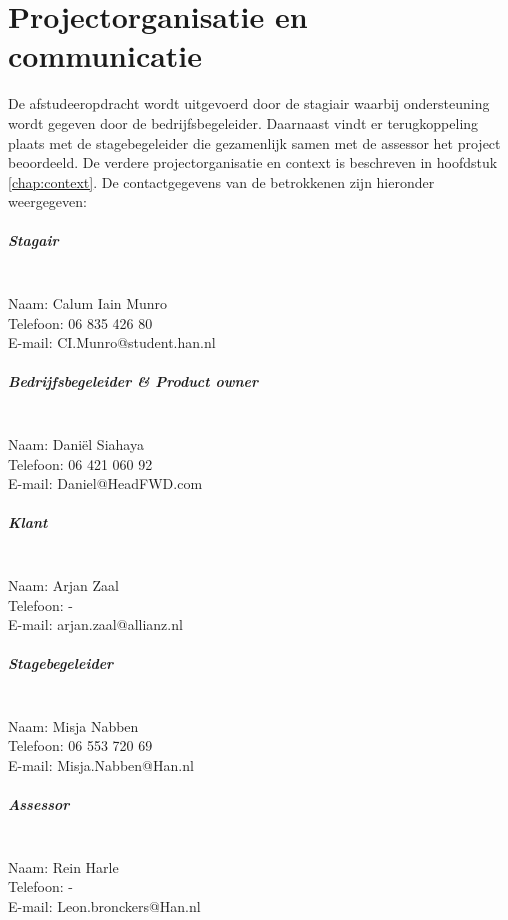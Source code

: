 \chapter{Projectorganisatie en communicatie}
De afstudeeropdracht wordt uitgevoerd door de stagiair waarbij ondersteuning wordt gegeven door de bedrijfsbegeleider. Daarnaast vindt er terugkoppeling plaats met de stagebegeleider die gezamenlijk samen met de assessor het project beoordeeld. De verdere projectorganisatie en context is beschreven in hoofdstuk \ref{chap:context}. De contactgegevens van de betrokkenen zijn hieronder weergegeven:\par
\paragraph{Stagair}~\\
Naam:		Calum Iain Munro\\
Telefoon:	06 835 426 80\\
E-mail:		CI.Munro@student.han.nl

\paragraph{Bedrijfsbegeleider \& Product owner}~\\
Naam:		Dani\"el Siahaya\\
Telefoon:	06 421 060 92\\
E-mail: 	Daniel@HeadFWD.com

\paragraph{Klant}~\\
Naam:		Arjan Zaal\\
Telefoon:	-\\
E-mail: 	arjan.zaal@allianz.nl

\paragraph{Stagebegeleider}~\\
Naam:		Misja Nabben\\
Telefoon:	06 553 720 69\\
E-mail:		Misja.Nabben@Han.nl

\paragraph{Assessor}~\\
Naam:		Rein Harle\\
Telefoon:	-\\
E-mail: 	Leon.bronckers@Han.nl
